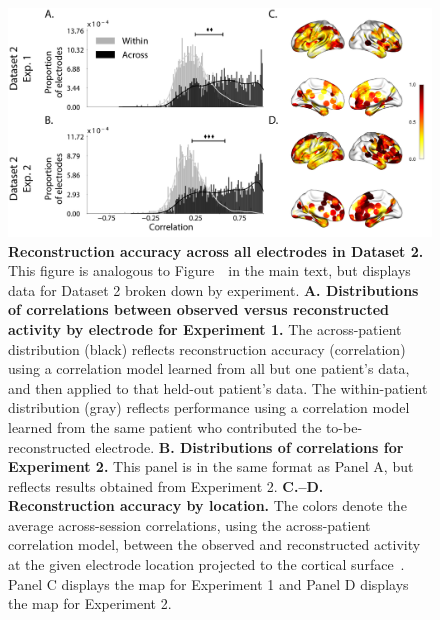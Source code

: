 \documentclass[11pt]{article}
\begin{document}
\begin{figure}[p]
\centering \includegraphics[width=\textwidth]{figs/supplemental_3}
\caption{\textbf{Reconstruction accuracy across all electrodes in Dataset 2.}
This figure is analogous to Figure~\corrmaps~in the main text, but displays data
for Dataset 2 broken down by experiment. \textbf{A. Distributions of
correlations between observed versus reconstructed activity by electrode for
Experiment 1.}  The across-patient distribution (black) reflects reconstruction
accuracy (correlation) using a correlation model learned from all but one
patient's data, and then applied to that held-out patient's data.  The
within-patient distribution (gray) reflects performance using a correlation
model learned from the same patient who contributed the to-be-reconstructed
electrode. \textbf{B. Distributions of correlations for Experiment 2.}  This
panel is in the same format as Panel A, but reflects results obtained from
Experiment 2. \textbf{C.--D. Reconstruction accuracy by location.} The colors
denote the average across-session correlations, using the across-patient
correlation model, between the observed and reconstructed activity at the given
electrode location projected to the cortical surface~\citep{CombEtal19}.  Panel
C displays the map for Experiment 1 and Panel D displays the map for Experiment 2.}
\label{fig:supplemental_3}
\end{figure}
\end{document}
